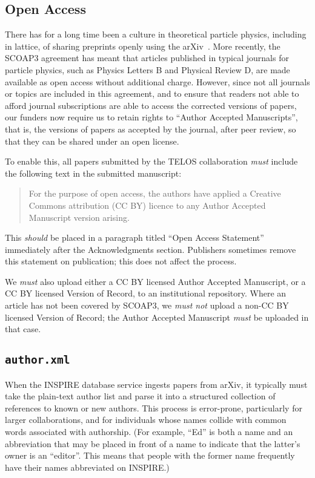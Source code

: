 \documentclass{article}
\newcommand\rfcword[1]{\emph{#1}\xspace}
\newcommand\must{\rfcword{must}}
\newcommand\mustnot{\rfcword{must not}}
\newcommand\should{\rfcword{should}}
\newcommand\filename[1]{\texttt{#1}\xspace}
\newcommand\authorxml{\filename{author.xml}\xspace}
\begin{document}
\subsection{Open Access}

There has for a long time been a culture in theoretical particle physics,
including in lattice,
of sharing preprints openly using the arXiv~\cite{ginsparg2021lessons}.
More recently,
the SCOAP3 agreement has meant that
articles published in
typical journals for particle physics,
such as Physics Letters B and Physical Review D,
are made available as open access without additional charge.
However,
since not all journals or topics are included in this agreement,
and to ensure
that readers not able to afford journal subscriptions
are able to access the corrected versions of papers,
our funders now require us to retain rights to
``Author Accepted Manuscripts'',
that is,
the versions of papers as accepted by the journal,
after peer review,
so that they can be shared under an open license.

To enable this,
all papers submitted by the TELOS collaboration
\must include the following text in the submitted manuscript:

\begin{quote}
  For the purpose of open access,
  the authors have applied a Creative Commons attribution (CC BY) licence
  to any Author Accepted Manuscript version arising.
\end{quote}

This \should be placed in a paragraph titled
``Open Access Statement''
immediately after the Acknowledgments section.
Publishers sometimes remove this statement on publication;
this does not affect the process.

We \must also upload either a CC BY licensed Author Accepted Manuscript,
or a CC BY licensed Version of Record,
to an institutional repository.
Where an article has not been covered by SCOAP3,
we \mustnot upload a non-CC BY licensed Version of Record;
the Author Accepted Manuscript \must be uploaded in that case.


\subsection{\authorxml}

When the INSPIRE database service ingests papers from arXiv,
it typically must take the plain-text author list
and parse it into a structured collection of references to known or new authors.
This process is error-prone,
particularly for larger collaborations,
and for individuals whose names collide with common words associated with authorship.
(For example,
``Ed'' is both a name
and an abbreviation that may be placed in front of a name
to indicate that the latter's owner is an ``editor''.
This means that people with the former name frequently have their names abbreviated on INSPIRE.)
\end{document}
